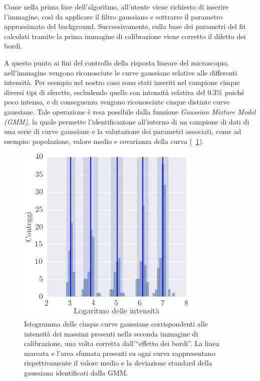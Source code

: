Come nella prima fase dell'algoritmo, all'utente viene richiesto di inserire l'immagine, così da applicare il filtro gaussiano e sottrarre il parametro approssimato del background. 
Successivamente, sulla base dei parametri del fit calcolati tramite la prima immagine di calibrazione viene corretto il difetto dei bordi.

A questo punto ai fini del controllo della risposta lineare del microscopio,  nell'immagine vengono riconosciute le curve gaussiane relative alle differenti intensità. 
Per esempio nel nostro caso sono stati inseriti nel campione cinque diversi tipi di sferette, escludendo quelle con intensità relativa del 0.3\% poiché poco intensa, e di conseguenza vengono riconosciute cinque distinte curve gaussiane.
Tale operazione è resa possibile dalla funzione \textit{Gaussian Mixture Model (GMM)}, la quale permette l'identificazione all'interno di un campione di dati di una serie di curve gaussiane e la valutazione dei parametri associati, come ad esempio: popolazione, valore medio e covarianza della curva (\figurename~\ref{fig:istogauss}).


\begin{figure}
 \centering
 \includegraphics[scale=.60]{img/CAP3istogauss.png}
 \caption{\small{Istogramma delle cinque curve gaussiane corrispondenti alle intensità dei massimi presenti nella seconda immagine di calibrazione, una volta corretta dall'``effetto dei bordi''. La linea marcata e l'area sfumata presenti su ogni curva rappresentano rispettivamente il valore medio e la deviazione standard della gaussiana identificati dalla GMM.}}
 \label{fig:istogauss}
\end{figure}


